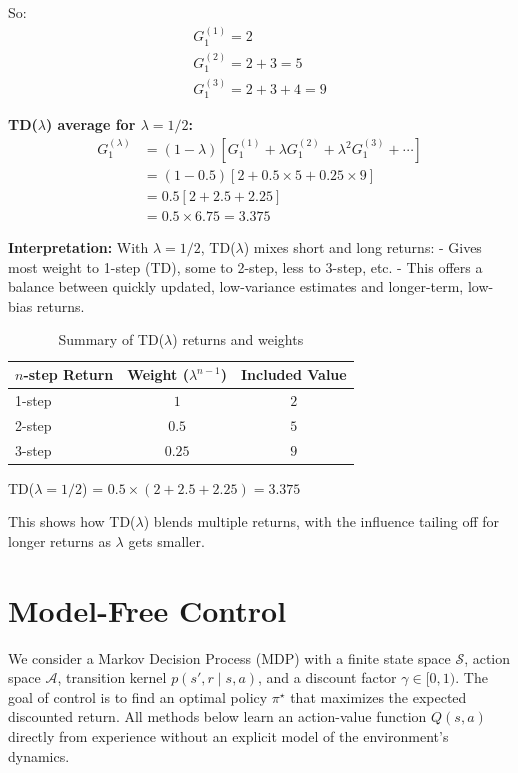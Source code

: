 \documentclass[12pt]{article}
\begin{document}
So:  
\begin{align*}
G_1^{(1)} = 2 \\
G_1^{(2)} = 2+3=5 \\
G_1^{(3)} = 2+3+4=9
\end{align*}

\textbf{TD($\lambda$) average for $\lambda=1/2$:}
\begin{align*}
G_1^{(\lambda)} &= (1 - \lambda) \left[G_1^{(1)} + \lambda G_1^{(2)} + \lambda^2 G_1^{(3)} + \cdots \right] \\
&= (1-0.5)\left[2 + 0.5 \times 5 + 0.25 \times 9\right] \\
&= 0.5 \left[2 + 2.5 + 2.25 \right] \\
&= 0.5 \times 6.75 = 3.375
\end{align*}

\textbf{Interpretation:}  
With $\lambda=1/2$, TD($\lambda$) mixes short and long returns:
- Gives most weight to 1-step (TD), some to 2-step, less to 3-step, etc.
- This offers a balance between quickly updated, low-variance estimates and longer-term, low-bias returns.

\begin{table}[h!]
\centering
\caption{Summary of TD($\lambda$) returns and weights}
\label{tab:td-lambda}
\begin{tabular}{|l|c|c|}
\hline
\textbf{$n$-step Return} & \textbf{Weight ($\lambda^{n-1}$)} & \textbf{Included Value} \\
\hline
1-step & $1$ & $2$ \\
2-step & $0.5$ & $5$ \\
3-step & $0.25$ & $9$ \\
\hline
\end{tabular}
\end{table}

TD($\lambda=1/2$) = $0.5 \times (2 + 2.5 + 2.25) = 3.375$

This shows how TD($\lambda$) blends multiple returns, with the influence tailing off for longer returns as $\lambda$ gets smaller.


\section{Model-Free Control}
We consider a Markov Decision Process (MDP) with a finite state space $\mathcal{S}$, action space $\mathcal{A}$, transition kernel $p(s',r \mid s,a)$, and a discount factor $\gamma \in [0, 1)$. The goal of control is to find an optimal policy $\pi^\star$ that maximizes the expected discounted return. All methods below learn an action-value function $Q(s,a)$ directly from experience without an explicit model of the environment's dynamics.
\end{document}
